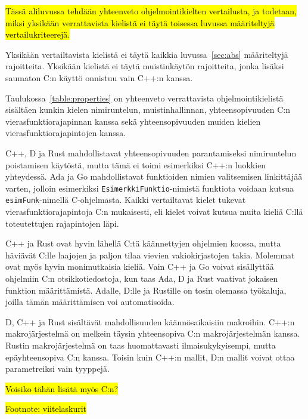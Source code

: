 \hl{Tässä aliluvussa tehdään yhteenveto ohjelmointikielten vertailusta, ja
todetaan, miksi yksikään verrattavista kielistä ei täytä toisessa luvussa
määriteltyjä vertailukriteerejä.}

Yksikään vertailtavista kielistä ei täytä kaikkia luvussa~\ref{sec:abs}
määriteltyjä rajoitteita. Yksikään kielistä ei täytä muistinkäytön rajoitteita,
jonka lisäksi saumaton C:n käyttö onnistuu vain C++:n kanssa.

Taulukossa~\ref{table:properties} on yhteenveto verrattavista
ohjelmointikielistä sisältäen kunkin kielen nimiruntelun, muistinhallinnan,
yhteensopivuuden C:n vierasfunktiorajapinnan kanssa sekä yhteensopivuuden
muiden kielien vierasfunktiorajapintojen kanssa.

C++, D ja Rust mahdollistavat yhteensopivuuden parantamiseksi nimiruntelun
poistamisen käytöstä, mutta tämä ei toimi esimerkiksi C++:n luokkien
yhteydessä. Ada ja Go mahdollistavat funktioiden nimien valitsemisen
linkittäjää varten, jolloin esimerkiksi \texttt{EsimerkkiFunktio}-nimistä
funktiota voidaan kutsua \texttt{esimFunk}-nimellä C-ohjelmasta. Kaikki
vertailtavat kielet tukevat vierasfunktiorajapintoja C:n mukaisesti, eli kielet
voivat kutsua muita kieliä C:llä toteutettujen rajapintojen läpi.

C++ ja Rust ovat hyvin lähellä C:tä käännettyjen ohjelmien koossa, mutta
häviävät C:lle laajojen ja paljon tilaa vievien vakiokirjastojen takia.
Molemmat ovat myös hyvin monimutkaisia kieliä. Vain C++ ja Go voivat
sisällyttää ohjelmiin C:n otsikkotiedostoja, kun taas Ada, D ja Rust vaativat
jokaisen funktion määrittämistä. Adalle, D:lle ja Rustille on tosin olemassa
työkaluja, joilla tämän määrittämisen voi automatisoida.

D, C++ ja Rust sisältävät mahdollisuuden käännösaikaisiin makroihin. C++:n
makrojärjestelmä on melkein täysin yhteensopiva C:n makrojärjestelmän kanssa.
Rustin makrojärjestelmä on taas huomattavasti ilmaisukykyisempi, mutta
epäyhteensopiva C:n kanssa. Toisin kuin C++:n mallit, D:n mallit voivat ottaa
parametreiksi vain tyyppejä.

\newpage

\hl{Voisiko tähän lisätä myös C:n?}

\hl{Footnote: viitelaskurit}

